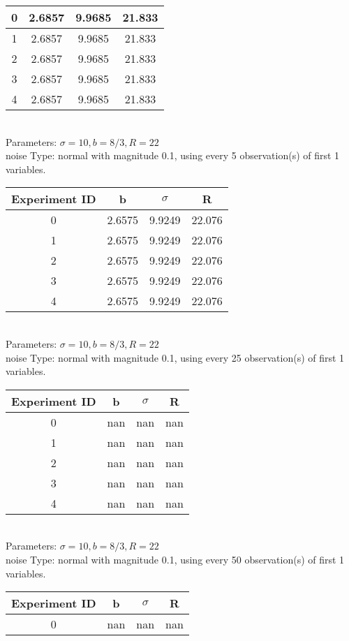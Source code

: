 \begin{multicols}{3}
\begin{tabular}{cccc}
0 & 2.6857 & 9.9685 & 21.833\\ \hline 
 1 & 2.6857 & 9.9685 & 21.833\\ \hline 
 2 & 2.6857 & 9.9685 & 21.833\\ \hline 
 3 & 2.6857 & 9.9685 & 21.833\\ \hline 
 4 & 2.6857 & 9.9685 & 21.833\\ \hline 
 \end{tabular}\\
Parameters: $\sigma=10, b=8/3, R=22$\\
noise Type: normal with magnitude 0.1, using every 5 observation(s) of first 1 variables.\\
\begin{tabular}{cccc}
\hline Experiment ID & b & $\sigma$ & R \\ \hline 
0 & 2.6575 & 9.9249 & 22.076\\ \hline 
 1 & 2.6575 & 9.9249 & 22.076\\ \hline 
 2 & 2.6575 & 9.9249 & 22.076\\ \hline 
 3 & 2.6575 & 9.9249 & 22.076\\ \hline 
 4 & 2.6575 & 9.9249 & 22.076\\ \hline 
 \end{tabular}\\
Parameters: $\sigma=10, b=8/3, R=22$\\
noise Type: normal with magnitude 0.1, using every 25 observation(s) of first 1 variables.\\
\begin{tabular}{cccc}
\hline Experiment ID & b & $\sigma$ & R \\ \hline 
0 & nan & nan & nan\\ \hline 
 1 & nan & nan & nan\\ \hline 
 2 & nan & nan & nan\\ \hline 
 3 & nan & nan & nan\\ \hline 
 4 & nan & nan & nan\\ \hline 
 \end{tabular}\\
Parameters: $\sigma=10, b=8/3, R=22$\\
noise Type: normal with magnitude 0.1, using every 50 observation(s) of first 1 variables.\\
\begin{tabular}{cccc}
\hline Experiment ID & b & $\sigma$ & R \\ \hline 
0 & nan & nan & nan\\ \hline 

\end{tabular}
\end{multicols}
